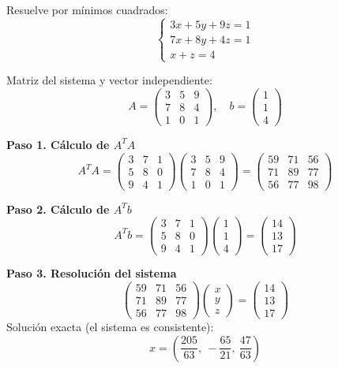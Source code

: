 \begin{example}
Resuelve por mínimos cuadrados:
\[
\begin{cases}
3x + 5y + 9z = 1 \\
7x + 8y + 4z = 1 \\
x + z = 4
\end{cases}
\]
\begin{myproof}
Matriz del sistema y vector independiente:
\[
A = \begin{pmatrix}
3 & 5 & 9 \\
7 & 8 & 4 \\
1 & 0 & 1
\end{pmatrix}, \quad
b = \begin{pmatrix} 1 \\ 1 \\ 4 \end{pmatrix}
\]

\textbf{Paso 1. Cálculo de $A^T A$}
\[
A^T A = \begin{pmatrix}
3 & 7 & 1 \\
5 & 8 & 0 \\
9 & 4 & 1
\end{pmatrix}
\begin{pmatrix}
3 & 5 & 9 \\
7 & 8 & 4 \\
1 & 0 & 1
\end{pmatrix}
= \begin{pmatrix}
59 & 71 & 56 \\
71 & 89 & 77 \\
56 & 77 & 98
\end{pmatrix}
\]

\textbf{Paso 2. Cálculo de $A^T b$}
\[
A^T b = \begin{pmatrix}
3 & 7 & 1 \\
5 & 8 & 0 \\
9 & 4 & 1
\end{pmatrix}
\begin{pmatrix} 1 \\ 1 \\ 4 \end{pmatrix}
= \begin{pmatrix} 14 \\ 13 \\ 17 \end{pmatrix}
\]

\textbf{Paso 3. Resolución del sistema}
\[
\begin{pmatrix}
59 & 71 & 56 \\
71 & 89 & 77 \\
56 & 77 & 98
\end{pmatrix}
\begin{pmatrix} x \\ y \\ z \end{pmatrix}
= \begin{pmatrix} 14 \\ 13 \\ 17 \end{pmatrix}
\]
Solución exacta (el sistema es consistente):
\[
x = \left( \frac{205}{63},\ -\frac{65}{21},\ \frac{47}{63} \right)
\]


\end{myproof}
\end{example}
